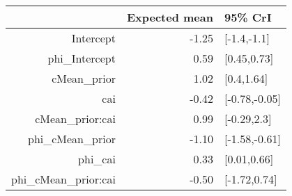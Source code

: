 \begin{tabular}{rrl}
  \hline
 & Expected mean & 95\% CrI \\ 
  \hline
Intercept & -1.25 & [-1.4,-1.1] \\ 
  phi\_Intercept & 0.59 & [0.45,0.73] \\ 
  cMean\_prior & 1.02 & [0.4,1.64] \\ 
  cai & -0.42 & [-0.78,-0.05] \\ 
  cMean\_prior:cai & 0.99 & [-0.29,2.3] \\ 
  phi\_cMean\_prior & -1.10 & [-1.58,-0.61] \\ 
  phi\_cai & 0.33 & [0.01,0.66] \\ 
  phi\_cMean\_prior:cai & -0.50 & [-1.72,0.74] \\ 
   \hline
\end{tabular}


